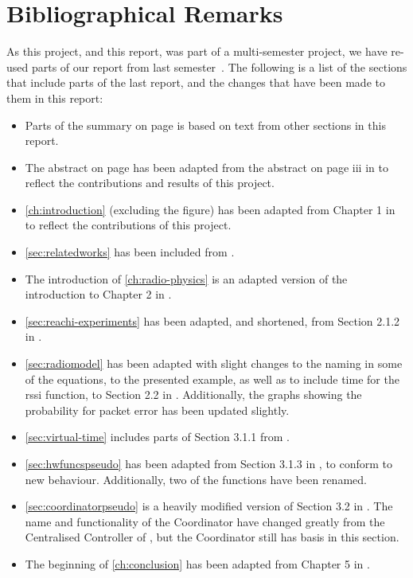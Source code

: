 \chapter{Bibliographical Remarks}
As this project, and this report, was part of a multi-semester project, we have re-used parts of
our report from last semester~\cite{paper:massivesims1}. The following is a list of the sections that include
parts of the last report, and the changes that have been made to them in this report:

\begin{itemize}
    \item Parts of the summary on page \pageref{ch:summary} is based on text from other sections in this
          report.
    \item The abstract on page \pageref{page:titlepage} has been adapted from the abstract on page iii in
          \cite{paper:massivesims1} to reflect the contributions and results of this project.
    \item \autoref{ch:introduction} (excluding the figure) has been adapted from Chapter 1 in
          \cite{paper:massivesims1} to reflect the contributions of this project.
    \item \autoref{sec:relatedworks} has been included from \cite{paper:massivesims1}.
    \item The introduction of \autoref{ch:radio-physics} is an adapted version of the introduction to Chapter
          2 in \cite{paper:massivesims1}.
    \item \autoref{sec:reachi-experiments} has been adapted, and shortened, from Section 2.1.2 in
          \cite{paper:massivesims1}.
    \item \autoref{sec:radiomodel} has been adapted with slight changes to the naming in some of the
          equations, to the presented example, as well as to include time for the \gls{rssi} function, to
          Section 2.2 in \cite{paper:massivesims1}. Additionally, the graphs showing the probability for packet
          error has been updated slightly.
    \item \autoref{sec:virtual-time} includes parts of Section 3.1.1 from \cite{paper:massivesims1}.
    \item \autoref{sec:hwfuncspseudo} has been adapted from Section 3.1.3 in \cite{paper:massivesims1}, to
          conform to new behaviour. Additionally, two of the functions have been renamed.
    \item \autoref{sec:coordinatorpseudo} is a heavily modified version of Section 3.2 in
          \cite{paper:massivesims1}. The name and functionality of the Coordinator have changed greatly from
          the Centralised Controller of \cite{paper:massivesims1}, but the Coordinator still has basis in this
          section.
    \item The beginning of \autoref{ch:conclusion} has been adapted from Chapter 5 in
          \cite{paper:massivesims1}.
\end{itemize}